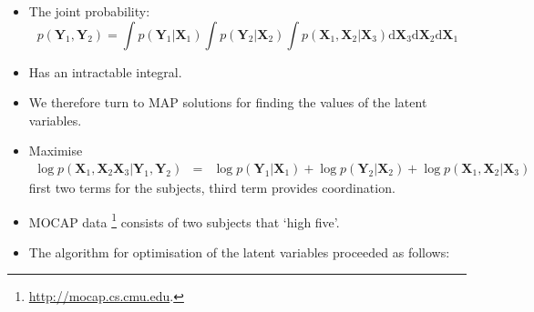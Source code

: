 \documentclass[english,color,smalltitle]{manchesterposter}
\begin{document}
\begin{multicols}{5}{\LARGE \par}
\begin{columnbox}
\begin{itemize}
\item The joint probability: \[
p\left(\mathbf{Y}_{1},\mathbf{Y}_{2}\right)=\int p\left(\mathbf{Y}_{1}|\mathbf{X}_{1}\right)\int p\left(\mathbf{Y}_{2}|\mathbf{X}_{2}\right)\int p\left(\mathbf{X}_{1},\mathbf{X}_{2}|\mathbf{X}_{3}\right)\mbox{d}\mathbf{X}_{3}\mbox{d}\mathbf{X}_{2}\mbox{d}\mathbf{X}_{1}\]
{\large \par}
\item Has an intractable integral. {\large \par}
\item We therefore turn to MAP solutions for finding the values of the latent
variables. {\large \par}
\item Maximise\begin{eqnarray*}
\log p\left(\mathbf{X}_{1},\mathbf{X}_{2}\mathbf{X}_{3}|\mathbf{Y}_{1},\mathbf{Y}_{2}\right) & = & \log p\left(\mathbf{Y}_{1}|\mathbf{X}_{1}\right)+\log p\left(\mathbf{Y}_{2}|\mathbf{X}_{2}\right)+\log p\left(\mathbf{X}_{1},\mathbf{X}_{2}|\mathbf{X}_{3}\right)\end{eqnarray*}
first two terms for the subjects, third term provides coordination.{\large \par}
\end{itemize}
\end{columnbox}


\begin{columnbox}



\begin{itemize}
\item MOCAP data%
\footnote{\url{http://mocap.cs.cmu.edu}.%
} consists of two subjects that `high five'. {\large \par}
\item The algorithm for optimisation of the latent variables proceeded as
follows:{\large \par}


\end{itemize}
\end{columnbox}
\end{multicols}
\end{document}
